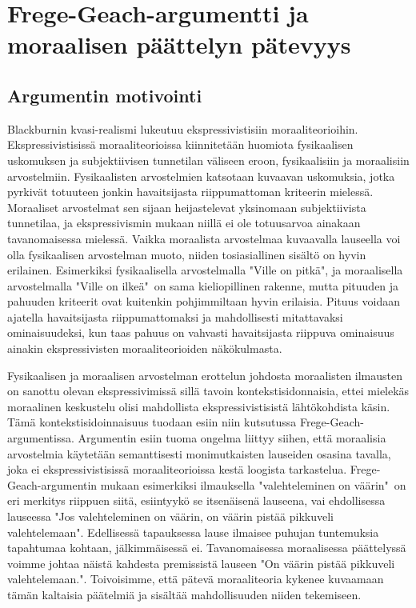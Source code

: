 \documentclass[a4paper,12pt,times,titlepage,finnish]{article}
\begin{document}
\section{Frege-Geach-argumentti ja moraalisen päät\-te\-lyn pätevyys}

\subsection{Argumentin motivointi}

Blackburnin kvasi-realismi lukeutuu ekspressivistisiin moraaliteorioihin.
Ekspressivistisissä moraaliteorioissa kiinnitetään huomiota fysikaalisen uskomuksen ja subjektiivisen tunnetilan väliseen eroon, fysikaalisiin ja moraalisiin arvostelmiin. Fysikaalisten arvostelmien katsotaan kuvaavan uskomuksia, jotka pyr\-ki\-vät totuuteen jonkin havaitsijasta riippumattoman kriteerin mielessä. Moraaliset arvostelmat sen sijaan heijastelevat yksinomaan subjektiivista tunnetilaa, ja ekspressivismin mukaan niillä ei ole totuusarvoa ainakaan tavanomaisessa mielessä. Vaikka moraalista arvostelmaa kuvaavalla lauseella voi olla fysikaalisen arvostelman muoto, niiden tosiasiallinen sisältö on hyvin erilainen. Esimerkiksi fysikaalisella arvostelmalla "Ville on pitkä", ja moraalisella arvostelmalla "Ville on ilkeä"\ on sama kieliopillinen rakenne, mutta pituuden ja pahuuden kriteerit ovat kuitenkin pohjimmiltaan hyvin erilaisia. Pituus voidaan ajatella havaitsijasta riippumattomaksi ja mahdollisesti mitattavaksi ominaisuudeksi, kun taas pahuus on vahvasti havaitsijasta riippuva ominaisuus ainakin ekspressivisten moraaliteorioiden näkökulmasta.

Fysikaalisen ja moraalisen arvostelman erottelun johdosta moraalisten ilmausten on sanottu olevan ekspressivimissä sillä tavoin kontekstisidonnaisia, ettei mielekäs moraalinen keskustelu olisi mahdollista ekspressivistisistä läh\-tö\-koh\-dis\-ta käsin. Tä\-mä kontekstisidoinnaisuus tuodaan esiin niin kutsutussa Frege-\-Geach-\-argumentissa. Argumentin esiin tuoma ongelma liittyy siihen, että moraalisia arvostelmia käy\-te\-tään semanttisesti monimutkaisten lauseiden osasina tavalla, joka ei ekspressivistisissä moraaliteorioissa kestä loogista tarkastelua. Frege-Geach-argumentin mukaan esimerkiksi ilmauksella "valehteleminen on väärin"\ on eri merkitys riippuen siitä, esiintyykö se itsenäisenä lauseena, vai ehdollisessa lauseessa "Jos valehteleminen on väärin, on väärin pistää pikkuveli valehtelemaan". Edellisessä tapauksessa lause ilmaisee puhujan tuntemuksia tapahtumaa kohtaan, jäl\-kim\-mäi\-ses\-sä ei. Tavanomaisessa moraalisessa päät\-te\-lys\-sä voimme johtaa näistä kahdesta premissistä lauseen "On väärin pistää pikkuveli valehtelemaan.". Toivoisimme, että pätevä moraaliteoria kykenee kuvaamaan tämän kaltaisia päätelmiä ja sisältää mahdollisuuden niiden tekemiseen.
\end{document}
